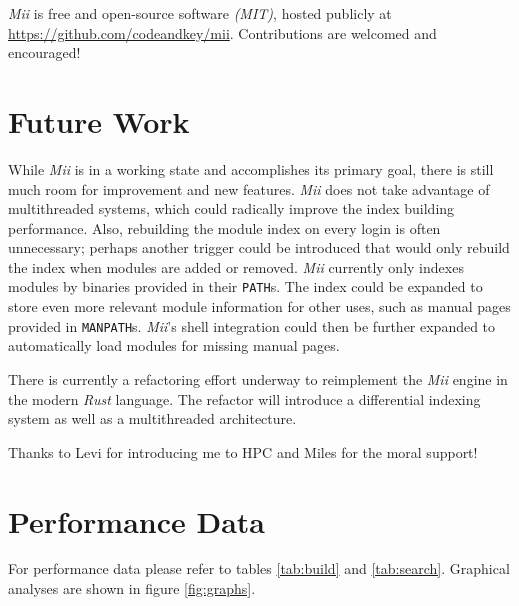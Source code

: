\documentclass[manuscript,screen]{acmart}
\begin{document}
\par

\textit{Mii} is free and open-source software \textit{(MIT)}, hosted publicly at \url{https://github.com/codeandkey/mii}. Contributions are welcomed and encouraged!

\section{Future Work}

While \textit{Mii} is in a working state and accomplishes its primary goal, there is still much room for improvement
and new features. \textit{Mii} does not take advantage of multithreaded systems, which could radically improve the
index building performance. Also, rebuilding the module index on every login is often unnecessary; perhaps
another trigger could be introduced that would only rebuild the index when modules are added or removed.
\textit{Mii} currently only indexes modules by binaries provided in their \texttt{PATH}s. The index could be expanded to
store even more relevant module information for other uses, such as manual pages provided in \texttt{MANPATH}s.
\textit{Mii}’s shell integration could then be further expanded to automatically load modules for missing manual
pages.

\par

There is currently a refactoring effort underway to reimplement the \textit{Mii} engine in the modern \textit{Rust} language.
The refactor will introduce a differential indexing system as well as a multithreaded architecture.

\begin{acks}
Thanks to Levi for introducing me to HPC and Miles for the moral support!
\end{acks}




\appendix
\section{Performance Data}
For performance data please refer to tables \ref{tab:build} and \ref{tab:search}. Graphical analyses are shown in figure \ref{fig:graphs}.
\end{document}
